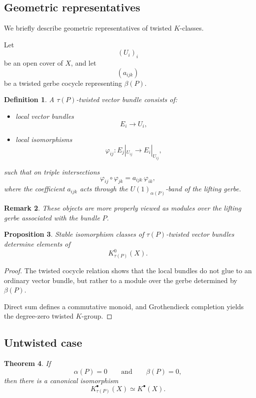 \documentclass[11pt]{amsart}
\newtheorem{definition}{Definition}[section]
\newtheorem{theorem}[definition]{Theorem}
\newtheorem{proposition}[definition]{Proposition}
\newtheorem{remark}[definition]{Remark}
\begin{document}
\subsection{Geometric representatives}

We briefly describe geometric representatives of twisted \(K\)-classes.

Let
\[
(U_i)_i
\]
be an open cover of \(X\), and let
\[
(a_{ijk})
\]
be a twisted gerbe cocycle representing \(\beta(P)\).

\begin{definition}
A \emph{\(\tau(P)\)-twisted vector bundle} consists of:
\begin{itemize}
\item local vector bundles
\[
E_i\to U_i,
\]

\item local isomorphisms
\[
\varphi_{ij}:
E_j|_{U_{ij}}
\longrightarrow
E_i|_{U_{ij}},
\]
\end{itemize}
such that on triple intersections
\[
\varphi_{ij}\circ\varphi_{jk}
=
a_{ijk}\,\varphi_{ik},
\]
where the coefficient \(a_{ijk}\) acts through the
\(U(1)_{\alpha(P)}\)-band of the lifting gerbe.
\end{definition}

\begin{remark}
These objects are more properly viewed as modules over the lifting gerbe
associated with the bundle \(P\).
\end{remark}

\begin{proposition}
Stable isomorphism classes of \(\tau(P)\)-twisted vector bundles determine
elements of
\[
K^0_{\tau(P)}(X).
\]
\end{proposition}

\begin{proof}
The twisted cocycle relation shows that the local bundles do not glue to an
ordinary vector bundle, but rather to a module over the gerbe determined by
\(\beta(P)\).

Direct sum defines a commutative monoid, and Grothendieck completion yields the
degree-zero twisted \(K\)-group.
\end{proof}

\subsection{Untwisted case}

\begin{theorem}
If
\[
\alpha(P)=0
\qquad\text{and}\qquad
\beta(P)=0,
\]
then there is a canonical isomorphism
\[
K^\bullet_{\tau(P)}(X)
\simeq
K^\bullet(X).
\]
\end{theorem}
\end{document}
